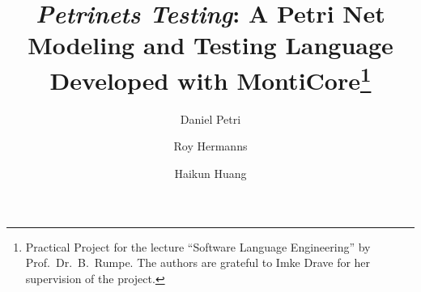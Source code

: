 \documentclass[runningheads,envcountsect,envcountsame]{lncs/llncs}
\begin{document}
\title{\emph{Petrinets Testing}: A Petri Net Modeling and Testing Language Developed with MontiCore\thanks{Practical Project for the lecture ``Software Language Engineering'' by Prof.\ Dr.\ B.\ Rumpe. The authors are grateful to Imke Drave for her supervision of the project.}}

\author{Daniel Petri \and
Roy Hermanns \and
Haikun Huang}

\maketitle












\end{document}
